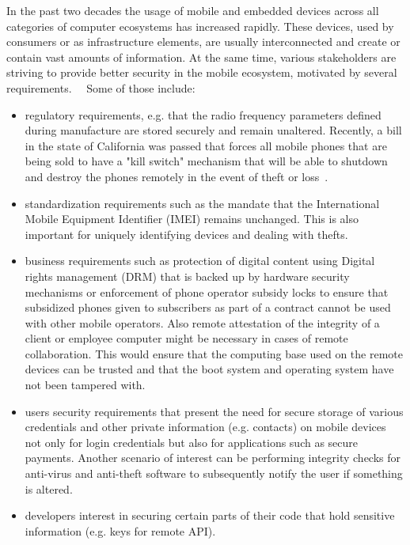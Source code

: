 \documentclass[cameraready]{cseminar}
\begin{document}
In the past two decades the usage of mobile and embedded devices across all categories of computer ecosystems has increased rapidly. These devices, used by consumers or as infrastructure elements, are usually interconnected and create or contain vast amounts of information. At the same time, various stakeholders are striving to provide better security in the mobile ecosystem, motivated by several requirements.~\cite{untapped}~\cite{zone} Some of those include: 

\begin{itemize}

\item regulatory requirements, e.g. that the radio frequency parameters defined during manufacture are stored securely and remain unaltered. Recently, a bill in the state of California was passed that forces all mobile phones that are being sold to have a "kill switch" mechanism that will be able to shutdown and destroy the phones remotely in the event of theft or loss~\cite{killswitch}.

\item standardization requirements such as the mandate that the International Mobile Equipment Identifier (IMEI) remains unchanged. This is also important for uniquely identifying devices and dealing with thefts.

\item business requirements such as protection of digital content using Digital rights management (DRM) that is backed up by hardware security mechanisms or enforcement of phone operator subsidy locks to ensure that subsidized phones given to subscribers as part of a contract cannot be used with other mobile operators. Also remote attestation of the integrity of a client or employee computer might be necessary in cases of remote collaboration. This would ensure that the computing base used on the remote devices can be trusted and that the boot system and operating system have not been tampered with.

\item users security requirements that present the need for secure storage of various credentials and other private information (e.g. contacts) on mobile devices not only for login credentials but also for applications such as secure payments. Another scenario of interest can be performing integrity checks for anti-virus and anti-theft software to subsequently notify the user if something is altered.

\item developers interest in securing certain parts of their code that hold sensitive information (e.g. keys for remote API).

\end{itemize}
\end{document}
